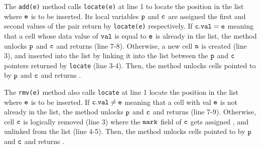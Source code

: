 %

 


The {\tt add(e)} method calls {\tt locate(e)} at line 1 to locate the position in the list where $\tt e$ is to be inserted. Its local variables $\tt p$ and $\tt c$ are assigned the first and second values of the pair return by {\tt locate(e)} respectively. If $\tt c.val = e$ meaning that a cell whose data value of $\tt val$ is equal to $\tt e$ is already in the list, the method unlocks $\tt p$ and $\tt c$ and returns \false \; (line 7-8). Otherwise, a new cell $\tt n$ is created (line 3), and inserted into the list by linking it into the list between the $\tt p$ and $\tt c$ pointers returned by
{\tt locate} (line 3-4). Then, the method unlocks cells pointed to by $\tt p$ and $\tt c$ and returns \true.  

The {\tt rmv(e)} method also calls {\tt locate} at line 1 locate the position in the list where $\tt e$ is to be inserted. If $\tt c.val \neq e$ meaning that a cell with val $\tt e$ is not already in the list, the method unlocks $\tt p$ and $\tt c$ and returns \false (line 7-9). Otherwise, cell $\tt c$ is logically removed (line 3) where the $\tt mark$ field of $\tt c$ gets assigned \true, and unlinked from the list (line 4-5). Then, the method unlocks cells pointed to by $\tt p$ and $\tt c$ and returns \true.  

